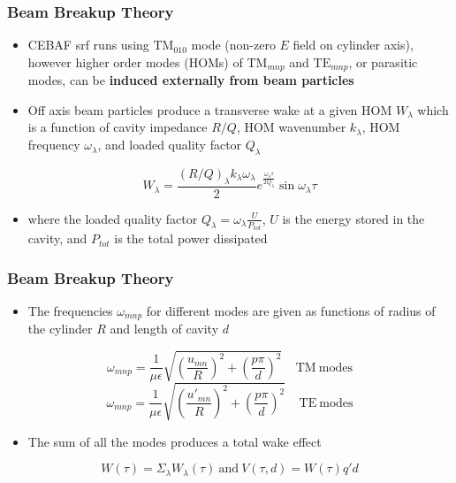 \documentclass{beamer}
\begin{document}


\begin{frame}
\frametitle{Beam Breakup Theory}
\begin{itemize}
\item CEBAF srf runs using $\mathrm{TM}_{010}$ mode (non-zero $E$ field on cylinder axis), however higher order modes (HOMs) of $\mathrm{TM}_{mnp}$ and $\mathrm{TE}_{mnp}$, or parasitic modes, can be \textbf{induced externally from beam particles}
\item Off axis beam particles produce a transverse wake at a given HOM $W_{\lambda}$ which is a function of cavity impedance $R/Q$, HOM wavenumber $k_{\lambda}$, HOM frequency $\omega_{\lambda}$, and loaded quality factor $Q_{\lambda}$
\end{itemize}
\begin{equation}
W_{\lambda}=\frac{(R/Q)_{\lambda} k_{\lambda} \omega_{\lambda}}{2} e^{\frac{\omega_{\lambda} \tau}{2 Q_{\lambda}}} \sin{\omega_{\lambda} \tau}
\end{equation}
\begin{itemize}
\item where the loaded quality factor $Q_{\lambda}=\omega_{\lambda} \frac{U}{P_{tot}}$, $U$ is the energy stored in the cavity, and $P_{tot}$ is the total power dissipated
\end{itemize}

\end{frame}


\begin{frame}
\frametitle{Beam Breakup Theory}
\begin{itemize}
\item The frequencies $\omega_{mnp}$ for different modes are given as functions of radius of the cylinder $R$ and length of cavity $d$
\end{itemize}
\begin{equation}
\omega_{mnp}=\frac{1}{\mu \epsilon} \sqrt{\left( \frac{u_{mn}}{R} \right)^2+ \left( \frac{p \pi}{d} \right)^2} \ \ \ \ \ \mathrm{TM \ modes}
\end{equation}
\begin{equation}
\omega_{mnp}=\frac{1}{\mu \epsilon} \sqrt{\left( \frac{u'_{mn}}{R} \right)^2+ \left( \frac{p \pi}{d} \right)^2} \ \ \ \ \ \mathrm{TE \ modes}
\end{equation}
\begin{itemize}
\item The sum of all the modes produces a total wake effect
\end{itemize}
\begin{equation}
W(\tau)=\Sigma_{\lambda} W_{\lambda}(\tau) \ \mathrm{and} \  V(\tau,d) = W(\tau) q' d
\end{equation}

\end{frame}
\end{document}
